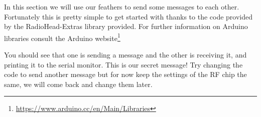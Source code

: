 In this section we will use our feathers to send some messages to each other. Fortunately this is pretty simple to get started with thanks to the code provided by the RadioHead-Extras library provided.
For further information on Arduino libraries consult the Arduino website\footnote{\url{https://www.arduino.cc/en/Main/Libraries}}


You should see that one is sending a message and the other is receiving it, and printing it to the serial monitor. This is our secret message! Try changing the code to send another message but for now keep the settings of the \gls{RF} chip the same, we will come back and change them later.